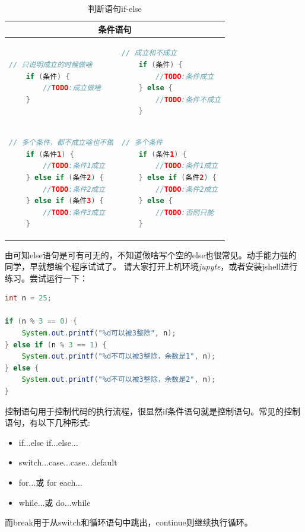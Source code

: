 \lstset{frame=none, aboveskip=0mm, belowskip=0mm}
\begin{table}[!htbp]\centering
\begin{tabular}{|p{6cm}|p{6cm}|}
\hline
\multicolumn{2}{|c|}{条件语句}\\
\hline
\begin{lstlisting}[language=Java]
    // 只说明成立的时候做啥
    if (条件) {
        //TODO:成立做啥
    }
\end{lstlisting}
&
\begin{lstlisting}[language=Java]
    // 成立和不成立
    if (条件) {
        //TODO:条件成立
    } else {
        //TODO:条件不成立
    }
\end{lstlisting} \\
\hline
\begin{lstlisting}[language=Java]
    // 多个条件，都不成立啥也不做
    if (条件1) {
        //TODO:条件1成立
    } else if (条件2) {
        //TODO:条件2成立
    } else if (条件3) {
        //TODO:条件3成立
    }
\end{lstlisting}
&
\begin{lstlisting}[language=Java]
    // 多个条件
    if (条件1) {
        //TODO:条件1成立
    } else if (条件2) {
        //TODO:条件2成立
    } else {
        //TODO:否则只能
    }
\end{lstlisting} \\
\hline
\end{tabular}
\caption{判断语句if-else}
\label{table:part1_java_if}
\end{table}
\lstset{frame=tb, aboveskip=3mm, belowskip=3mm,}

由可知else语句是可有可无的，不知道做啥写个空的else{}也很常见。动手能力强的同学，早就想编个程序试试了。
请大家打开上机环境\emph{jupyte}，或者安装jshell进行练习。尝试运行一下：
\begin{lstlisting}[language=Java, caption={if-else练习},label=code:part1_java_if_else_ex]
int n = 25;

if (n % 3 == 0) {
    System.out.printf("%d可以被3整除", n);
} else if (n % 3 == 1) {
    System.out.printf("%d不可以被3整除，余数是1", n);
} else {
    System.out.printf("%d不可以被3整除，余数是2", n);
}
\end{lstlisting}

控制语句用于控制代码的执行流程，很显然if条件语句就是控制语句。常见的控制语句，有以下几种形式:
\begin{itemize}
\item[1.] if...else if...else...
\item[2.] switch...case...case...default
\item[3.] for...或 for each...
\item[4.] while...或 do...while
\end{itemize}
而break用于从switch和循环语句中跳出，continue则继续执行循环。


